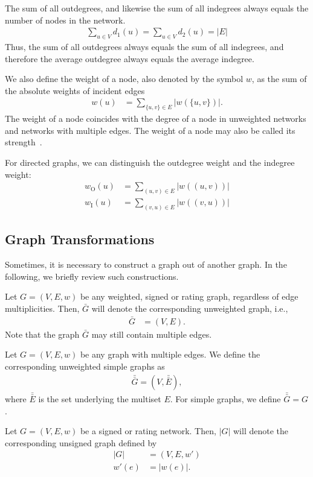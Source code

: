 \documentclass{article}
\begin{document}
The sum of all outdegrees, and likewise the sum of all indegrees always
equals the number of nodes in the network.  
\begin{align}
  \sum_{u\in V} d_1(u) = \sum_{u \in V} d_2(u) = |E|
\end{align}
Thus, the sum of all outdegrees always equals the sum of all indegrees,
and therefore the average outdegree always equals the average indegree.  

We also define the weight of a node, also denoted by the symbol $w$, as
the sum of the absolute weights of incident edges
\begin{align}
  w(u) &= \sum_{ \{u,v\} \in E} |w(\{u,v\})|. 
\end{align}
The weight of a node coincides with the degree of a node in unweighted
networks and networks with multiple edges. 
The weight of a node may also be called its strength~\cite{b792}. 

For directed graphs, we can distinguish the outdegree weight and the
indegree weight:
\begin{align}
  w_{\mathrm O}(u) &= \sum_{(u,v)\in E} |w((u,v))| \\
  w_{\mathrm I}(u) &= \sum_{(v,u)\in E} |w((v,u))| 
\end{align}

\subsection{Graph Transformations}
Sometimes, it is necessary to construct a graph out of another graph.
In the following, we briefly review such constructions.  

Let $G=(V,E,w)$ be any weighted, signed or rating graph, regardless of
edge multiplicities.  Then, $\bar G$ will denote the corresponding
unweighted graph, i.e.,
\begin{align}
  \bar G &= (V,E).
\end{align}
Note that the graph $\bar G$ may still contain multiple edges. 

Let $G=(V,E,w)$ be any graph with multiple edges.  We define the
corresponding unweighted simple graphs as
\begin{align}
  \bar{\bar{G}} = (V, \bar{\bar E}),
\end{align}
where $\bar{\bar E}$ is the set underlying the multiset $E$. For simple
graphs, we define $\bar{\bar G} = G$. 

Let $G=(V,E,w)$ be a signed or rating network.  Then, $|G|$ will denote
the corresponding unsigned graph defined by
\begin{align}
  |G| &= (V,E, w') \\
  w'(e) &= |w(e)|. \nonumber
\end{align}
\end{document}
